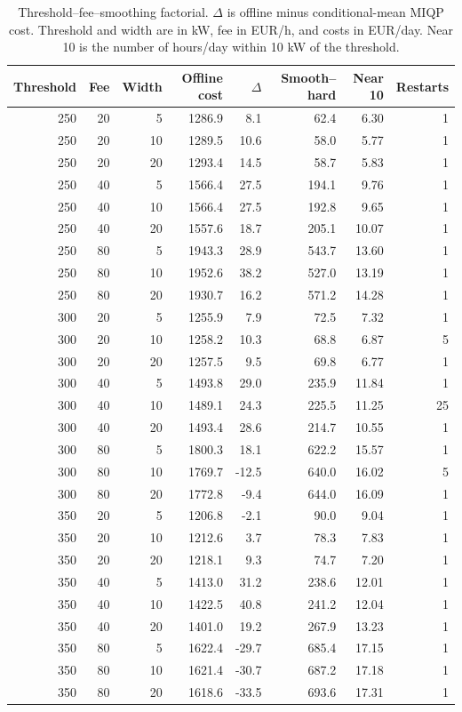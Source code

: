 \begin{table}[ht]
\centering
\scriptsize
\caption{Threshold--fee--smoothing factorial. $\Delta$ is offline minus conditional-mean MIQP cost. Threshold and width are in kW, fee in EUR/h, and costs in EUR/day. Near 10 is the number of hours/day within 10 kW of the threshold.}
\label{tab:supp-factorial}
\begin{tabular}{rrrrrrrr}
\toprule
Threshold & Fee & Width & Offline cost & $\Delta$ & Smooth--hard & Near 10 & Restarts \\
\midrule
250 & 20 & 5 & 1286.9 & 8.1 & 62.4 & 6.30 & 1 \\
250 & 20 & 10 & 1289.5 & 10.6 & 58.0 & 5.77 & 1 \\
250 & 20 & 20 & 1293.4 & 14.5 & 58.7 & 5.83 & 1 \\
250 & 40 & 5 & 1566.4 & 27.5 & 194.1 & 9.76 & 1 \\
250 & 40 & 10 & 1566.4 & 27.5 & 192.8 & 9.65 & 1 \\
250 & 40 & 20 & 1557.6 & 18.7 & 205.1 & 10.07 & 1 \\
250 & 80 & 5 & 1943.3 & 28.9 & 543.7 & 13.60 & 1 \\
250 & 80 & 10 & 1952.6 & 38.2 & 527.0 & 13.19 & 1 \\
250 & 80 & 20 & 1930.7 & 16.2 & 571.2 & 14.28 & 1 \\
300 & 20 & 5 & 1255.9 & 7.9 & 72.5 & 7.32 & 1 \\
300 & 20 & 10 & 1258.2 & 10.3 & 68.8 & 6.87 & 5 \\
300 & 20 & 20 & 1257.5 & 9.5 & 69.8 & 6.77 & 1 \\
300 & 40 & 5 & 1493.8 & 29.0 & 235.9 & 11.84 & 1 \\
300 & 40 & 10 & 1489.1 & 24.3 & 225.5 & 11.25 & 25 \\
300 & 40 & 20 & 1493.4 & 28.6 & 214.7 & 10.55 & 1 \\
300 & 80 & 5 & 1800.3 & 18.1 & 622.2 & 15.57 & 1 \\
300 & 80 & 10 & 1769.7 & -12.5 & 640.0 & 16.02 & 5 \\
300 & 80 & 20 & 1772.8 & -9.4 & 644.0 & 16.09 & 1 \\
350 & 20 & 5 & 1206.8 & -2.1 & 90.0 & 9.04 & 1 \\
350 & 20 & 10 & 1212.6 & 3.7 & 78.3 & 7.83 & 1 \\
350 & 20 & 20 & 1218.1 & 9.3 & 74.7 & 7.20 & 1 \\
350 & 40 & 5 & 1413.0 & 31.2 & 238.6 & 12.01 & 1 \\
350 & 40 & 10 & 1422.5 & 40.8 & 241.2 & 12.04 & 1 \\
350 & 40 & 20 & 1401.0 & 19.2 & 267.9 & 13.23 & 1 \\
350 & 80 & 5 & 1622.4 & -29.7 & 685.4 & 17.15 & 1 \\
350 & 80 & 10 & 1621.4 & -30.7 & 687.2 & 17.18 & 1 \\
350 & 80 & 20 & 1618.6 & -33.5 & 693.6 & 17.31 & 1 \\
\bottomrule
\end{tabular}
\end{table}